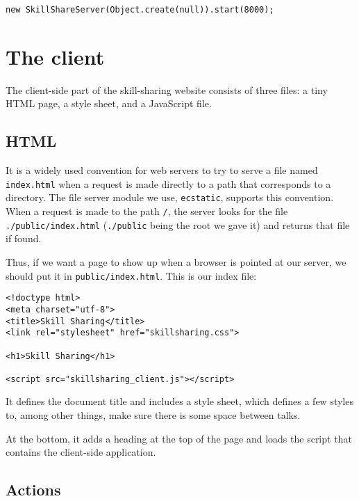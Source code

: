 \begin{lstlisting}
new SkillShareServer(Object.create(null)).start(8000);
\end{lstlisting}
\noindent

\section{The client}

The client-side part of the skill-sharing website consists of three files: a tiny HTML page, a style sheet, and a JavaScript file.

\subsection{HTML}

It is a widely used convention for web servers to try to serve a file named \lstinline`index.html` when a request is made directly to a path that corresponds to a directory. The file server module we use, \lstinline`ecstatic`, supports this convention. When a request is made to the path \lstinline`/`, the server looks for the file \lstinline`./public/index.html` (\lstinline`./public` being the root we gave it) and returns that file if found.

Thus, if we want a page to show up when a browser is pointed at our server, we should put it in \lstinline`public/index.html`. This is our index file:

\begin{lstlisting}
<!doctype html>
<meta charset="utf-8">
<title>Skill Sharing</title>
<link rel="stylesheet" href="skillsharing.css">

<h1>Skill Sharing</h1>

<script src="skillsharing_client.js"></script>
\end{lstlisting}
\noindent{}

It defines the document title and includes a style sheet, which defines a few styles to, among other things, make sure there is some space between talks.

At the bottom, it adds a heading at the top of the page and loads the script that contains the client-side application.

\subsection{Actions}

